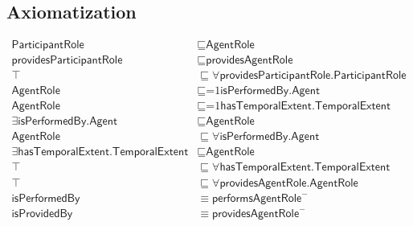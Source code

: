 \subsection{Axiomatization}
\label{axs:ParticipantRole}
\begin{align}
\textsf{ParticipantRole} &\sqsubseteq \textsf{AgentRole} \\
\textsf{providesParticipantRole} &\sqsubseteq \textsf{providesAgentRole} \\
\top &\sqsubseteq \forall \textsf{providesParticipantRole.ParticipantRole} \\
\textsf{AgentRole} &\sqsubseteq \text{=1}\textsf{isPerformedBy.Agent} \\
\textsf{AgentRole} &\sqsubseteq \text{=1}\textsf{hasTemporalExtent.TemporalExtent} \\
\exists\textsf{isPerformedBy.Agent} &\sqsubseteq \textsf{AgentRole} \\
\textsf{AgentRole} &\sqsubseteq \forall\textsf{isPerformedBy.Agent} \\
\exists\textsf{hasTemporalExtent.TemporalExtent} &\sqsubseteq \textsf{AgentRole} \\
\top &\sqsubseteq \forall\textsf{hasTemporalExtent.TemporalExtent} \\
\top &\sqsubseteq \forall\textsf{providesAgentRole.AgentRole} \\
\textsf{isPerformedBy} &\equiv \textsf{performsAgentRole}^- \\
\textsf{isProvidedBy} &\equiv \textsf{providesAgentRole}^-
\end{align}

